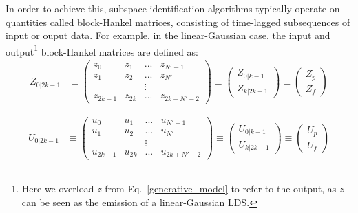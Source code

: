 In order to achieve this, subspace identification algorithms typically operate on quantities called block-Hankel matrices, consisting of time-lagged subsequences of input or ouput data. For example, in the linear-Gaussian case, the input and output\footnote{Here we overload $z$ from Eq.~\ref{generative_model} to refer to the output, as $z$ can be seen as the emission of a linear-Gaussian LDS.} block-Hankel matrices are defined as:
\begin{align*}
    Z_{0|2k-1} &\equiv 
        \begin{pmatrix}
            z_0 & z_1 & ... & z_{N' - 1} \\
            z_1 & z_2 & ... & z_{N'} \\
             & & \vdots & \\
            z_{2k - 1} & z_{2k} & ... & z_{2k + N' - 2}
        \end{pmatrix} 
        \equiv \begin{pmatrix}
            Z_{0| k-1} \\
            Z_{k | 2k - 1}
        \end{pmatrix} 
        \equiv \begin{pmatrix}
            Z_p \\
            Z_f
        \end{pmatrix} \\\\
\end{align*}
\begin{align*}
    U_{0|2k-1} &\equiv 
         \begin{pmatrix}
             u_0 & u_1 & ... & u_{N' - 1} \\
             u_1 & u_2 & ... & u_{N'} \\
              & & \vdots & \\
             u_{2k - 1} & u_{2k} & ... & u_{2k + N' - 2}
         \end{pmatrix} 
         \equiv \begin{pmatrix}
             U_{0| k-1} \\
             U_{k | 2k - 1}
             \end{pmatrix} 
        \equiv \begin{pmatrix}
             U_p \\
             U_f
         \end{pmatrix}
\end{align*}

